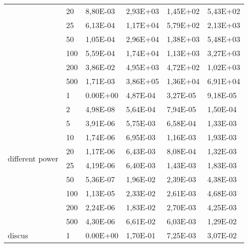 \begin{longtable}[c]{|p{3.5cm}|l|l|l|l|l|}
                                        & 20        & 8,80E-03   & 2,93E+03   & 1,45E+02   & 5,43E+02  \\ \cline{2-6} 
                                        & 25        & 6,13E-04   & 1,17E+04   & 5,79E+02   & 2,13E+03  \\ \cline{2-6} 
                                        & 50        & 1,05E-04   & 2,96E+04   & 1,38E+03   & 5,48E+03  \\ \cline{2-6} 
                                        & 100       & 5,59E-04   & 1,74E+04   & 1,13E+03   & 3,27E+03  \\ \cline{2-6} 
                                        & 200       & 3,86E-02   & 4,95E+03   & 4,72E+02   & 1,02E+03  \\ \cline{2-6} 
                                        & 500       & 1,71E-03   & 3,86E+05   & 1,36E+04   & 6,91E+04  \\ \hline
\multirow[t]{10}{*}{different power}       & 1         & 0.00E+00   & 4,87E-04   & 3,27E-05   & 9,18E-05  \\ \cline{2-6} 
                                        & 2         & 4,98E-08   & 5,64E-04   & 7,94E-05   & 1,50E-04  \\ \cline{2-6} 
                                        & 5         & 3,91E-06   & 5,75E-03   & 6,58E-04   & 1,33E-03  \\ \cline{2-6} 
                                        & 10        & 1,74E-06   & 6,95E-03   & 1,16E-03   & 1,93E-03  \\ \cline{2-6} 
                                        & 20        & 1,17E-06   & 6,43E-03   & 8,08E-04   & 1,32E-03  \\ \cline{2-6} 
                                        & 25        & 4,19E-06   & 6,40E-03   & 1,43E-03   & 1,83E-03  \\ \cline{2-6} 
                                        & 50        & 5,36E-07   & 1,96E-02   & 2,39E-03   & 4,38E-03  \\ \cline{2-6} 
                                        & 100       & 1,13E-05   & 2,33E-02   & 2,61E-03   & 4,68E-03  \\ \cline{2-6} 
                                        & 200       & 2,24E-06   & 1,83E-02   & 2,70E-03   & 4,25E-03  \\ \cline{2-6} 
                                        & 500       & 4,30E-06   & 6,61E-02   & 6,03E-03   & 1,29E-02  \\ \hline
\multirow[t]{10}{*}{discus}                & 1         & 0.00E+00   & 1,70E-01   & 7,25E-03   & 3,07E-02  \\ \cline{2-6} 

\end{longtable}
